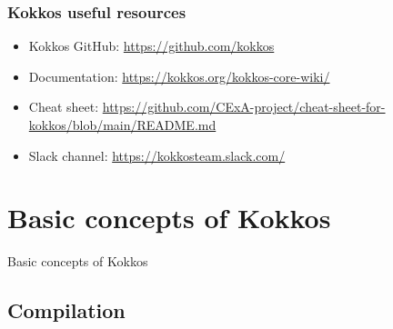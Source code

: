 \documentclass[aspectratio=169]{beamer}
\begin{document}
\begin{frame}
    \frametitle{Kokkos useful resources} 
    \begin{itemize}
        \item Kokkos GitHub: \href{https://github.com/kokkos}{https://github.com/kokkos}
        \item Documentation: \href{https://kokkos.org/kokkos-core-wiki/}{https://kokkos.org/kokkos-core-wiki/}
        \item Cheat sheet: \href{https://github.com/CExA-project/cheat-sheet-for-kokkos/blob/main/README.md}{https://github.com/CExA-project/cheat-sheet-for-kokkos/blob/main/README.md}
        \item Slack channel: \href{https://kokkosteam.slack.com/}{https://kokkosteam.slack.com/}
    \end{itemize}
\end{frame}


\section{Basic concepts of Kokkos}

\begin{frame}
    \centering
    \Huge Basic concepts of Kokkos
\end{frame}


\subsection[Compilation]{Compilation}

\end{document}
